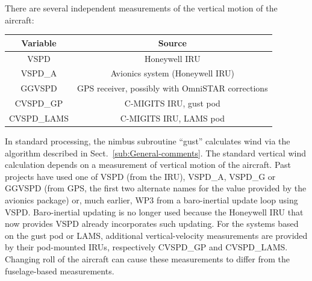\documentclass[12pt,twoside,english]{article}\usepackage[]{graphicx}\usepackage[]{color}
\providecommand{\tabularnewline}{\\}
\let\OrgIndex\index
\renewcommand*{\index}[1]{\OrgIndex{#1}}
\begin{document}
There are several independent measurements of the vertical motion of the aircraft: 

\noindent \begin{center}
\begin{tabular}{|c|c|}
\hline 
\textbf{Variable}  &
\textbf{Source}\tabularnewline
\hline 
\hline 
VSPD  &
Honeywell IRU\tabularnewline
\hline 
VSPD\_A  &
Avionics system (Honeywell IRU)\tabularnewline
\hline 
GGVSPD  &
GPS receiver, possibly with OmniSTAR corrections\tabularnewline
\hline 
CVSPD\_GP  &
C-MIGITS IRU, gust pod\tabularnewline
\hline 
CVSPD\_LAMS  &
C-MIGITS IRU, LAMS pod\tabularnewline
\hline 
\end{tabular}
\par\end{center}

In standard processing, the nimbus subroutine ``gust''
calculates wind via the algorithm described in Sect.~\ref{sub:General-comments}.
The standard vertical wind calculation depends on a measurement of
vertical motion of the aircraft. Past projects have used one of VSPD
(from the IRU), VSPD\_A, VSPD\_G or GGVSPD (from GPS, the first two
alternate names for the value provided by the avionics package) or,
much earlier, WP3 from a baro-inertial update loop using VSPD. Baro-inertial
updating is no longer used because the Honeywell IRU that now provides
VSPD already incorporates such updating. For the systems based on
the gust pod or LAMS, additional vertical-velocity measurements are
provided by their pod-mounted IRUs, respectively CVSPD\_GP and CVSPD\_LAMS.
Changing roll of the aircraft can cause these measurements to differ
from the fuselage-based measurements.
\end{document}
